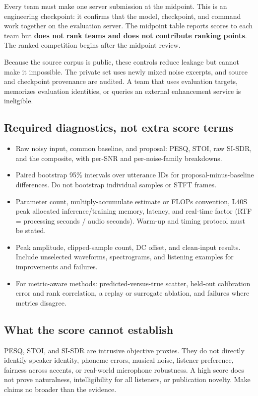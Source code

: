 \documentclass[11pt,letterpaper]{article}
\begin{document}
Every team must make one server submission at the midpoint. This is an engineering checkpoint: it confirms that the model, checkpoint, and command work together on the evaluation server. The midpoint table reports scores to each team but \textbf{does not rank teams and does not contribute ranking points}. The ranked competition begins after the midpoint review.

Because the source corpus is public, these controls reduce leakage but cannot make it impossible. The private set uses newly mixed noise excerpts, and source and checkpoint provenance are audited. A team that uses evaluation targets, memorizes evaluation identities, or queries an external enhancement service is ineligible.

\subsection{Required diagnostics, not extra score terms}
\begin{itemize}
\item Raw noisy input, common baseline, and proposal: PESQ, STOI, raw SI-SDR, and the composite, with per-SNR and per-noise-family breakdowns.
\item Paired bootstrap 95\% intervals over utterance IDs for proposal-minus-baseline differences. Do not bootstrap individual samples or STFT frames.
\item Parameter count, multiply-accumulate estimate or FLOPs convention, L40S peak allocated inference/training memory, latency, and real-time factor (RTF = processing seconds / audio seconds). Warm-up and timing protocol must be stated.
\item Peak amplitude, clipped-sample count, DC offset, and clean-input results. Include unselected waveforms, spectrograms, and listening examples for improvements and failures.
\item For metric-aware methods: predicted-versus-true scatter, held-out calibration error and rank correlation, a replay or surrogate ablation, and failures where metrics disagree.
\end{itemize}

\subsection{What the score cannot establish}
PESQ, STOI, and SI-SDR are intrusive objective proxies. They do not directly identify speaker identity, phoneme errors, musical noise, listener preference, fairness across accents, or real-world microphone robustness. A high score does not prove naturalness, intelligibility for all listeners, or publication novelty. Make claims no broader than the evidence.
\end{document}
